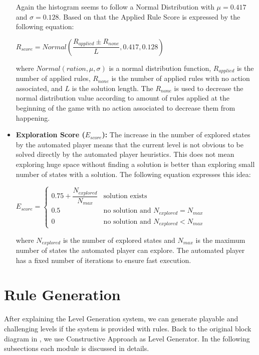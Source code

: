 \begin{itemize}
	
	Again the histogram seems to follow a Normal Distribution with $\mu = 0.417$ and $\sigma = 0.128$. Based on that the Applied Rule Score is expressed by the following equation:
	\begin{center}$R_{score} = Normal(\dfrac{R_{applied} \pm R_{none}}{L}, 0.417, 0.128)$\end{center}
	where $Normal(ration, \mu, \sigma)$ is a normal distribution function, $R_{applied}$ is the number of applied rules, $R_{none}$ is the number of applied rules with no action associated, and $L$ is the solution length. The $R_{none}$ is used to decrease the normal distribution value according to amount of rules applied at the beginning of the game with no action associated to decrease them from happening.
	
	\item \textbf{Exploration Score ($E_{score}$):} The increase in the number of explored states by the automated player means that the current level is not obvious to be solved directly by the automated player heuristics. This does not mean exploring huge space without finding a solution is better than exploring small number of states with a solution. The following equation expresses this idea:
	\begin{center}
	$E_{score}= \begin{cases}
	               0.75 + \dfrac{N_{explored}}{N_{max}} & \text{solution exists}\\
	               0.5 & \text{no solution and }N_{explored} = N_{max}\\
	               0 & \text{no solution and }N_{explored} < N_{max}
	           \end{cases}$
	\end{center}
	where $N_{explored}$ is the number of explored states and $N_{max}$ is the maximum number of states the automated player can explore. The automated player has a fixed number of iterations to ensure fast execution.
\end{itemize}

\section{Rule Generation}
After explaining the Level Generation system, we can generate playable and challenging levels if the system is provided with rules. Back to the original block diagram in , we use Constructive Approach as Level Generator. In the following subsections each module is discussed in details.

